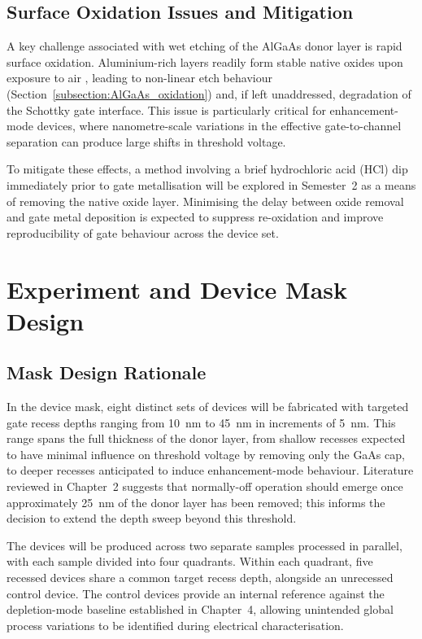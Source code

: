 \subsection{Surface Oxidation Issues and Mitigation}

A key challenge associated with wet etching of the AlGaAs donor layer
is rapid surface oxidation. Aluminium-rich layers readily form stable
native oxides upon exposure to air \cite{moriarty1992preliminary}, leading to non-linear etch
behaviour (Section~\ref{subsection:AlGaAs_oxidation}) and, if left
unaddressed, degradation of the Schottky gate interface. This issue is
particularly critical for enhancement-mode devices, where
nanometre-scale variations in the effective gate-to-channel separation
can produce large shifts in threshold voltage.

To mitigate these effects, a method involving a brief hydrochloric
acid (HCl) dip immediately prior to gate metallisation will be explored
in Semester~2 as a means of removing the native oxide layer. Minimising
the delay between oxide removal and gate metal deposition is expected
to suppress re-oxidation and improve reproducibility of gate behaviour
across the device set.

\section{Experiment and Device Mask Design}

\subsection{Mask Design Rationale}

In the device mask, eight distinct sets of devices will be fabricated
with targeted gate recess depths ranging from 10~nm to 45~nm in
increments of 5~nm. This range spans the full thickness of the donor
layer, from shallow recesses expected to have minimal influence on
threshold voltage by removing only the GaAs cap, to deeper recesses
anticipated to induce enhancement-mode behaviour. Literature reviewed
in Chapter~2 suggests that normally-off operation should emerge once
approximately 25~nm of the donor layer has been removed; this informs
the decision to extend the depth sweep beyond this threshold.

\vspace{2mm}

The devices will be produced across two separate samples processed in
parallel, with each sample divided into four quadrants. Within each
quadrant, five recessed devices share a common target recess depth,
alongside an unrecessed control device. The control devices provide an
internal reference against the depletion-mode baseline established in
Chapter~4, allowing unintended global process variations to be
identified during electrical characterisation.

